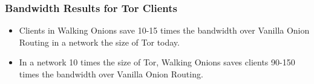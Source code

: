 \documentclass[hyperref={pdfpagelabels=true},table,dvipsnames,14pt,aspectratio=169]{beamer}
\begin{document}
\begin{frame}
\frametitle{Bandwidth Results for Tor Clients}

\begin{center}
  \hspace{-1.7cm}
  \begin{minipage}[t] {0.45\linewidth}
    \vspace*{8em}
  \end{minipage}
  \hspace{0.5cm}
  \begin{minipage}[t] {0.45\linewidth}
    \vspace*{8em}
  \end{minipage}
\end{center}

  \footnotesize
  \begin{itemize}
    \item<2->  Clients in Walking Onions save 10-15 times the bandwidth over
      Vanilla Onion Routing in a network the size of Tor today.
    \item<3->  In a network 10 times the size of Tor, Walking Onions saves
      clients 90-150 times the bandwidth over Vanilla Onion Routing.
  \end{itemize}
\end{frame}
\end{document}
